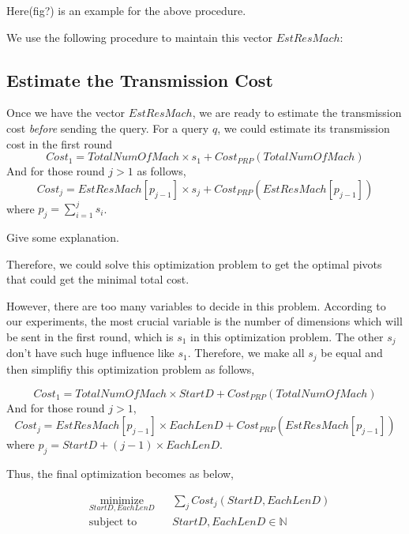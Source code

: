 Here(fig?) is an example for the above procedure.



We use the following procedure to maintain this vector $EstResMach$:








\subsection{Estimate the Transmission Cost} %
\label{ss:estimate_the_transmission_cost}

Once we have the vector $EstResMach$, we are ready to estimate the transmission cost \emph{before} sending the query.  For a query $q$, we could estimate its transmission cost in the first round 
\[
Cost_1 = TotalNumOfMach\times s_1 + Cost_{PRP}(TotalNumOfMach)
\]
And for those round $j>1$ as follows,
\[
Cost_j = EstResMach[p_{j-1}]\times s_j + Cost_{PRP}(EstResMach[p_{j-1}])
\]
where $p_j=\sum^j_{i=1}{s_i}$.

Give some explanation.

Therefore, we could solve this optimization problem to get the optimal pivots that could get the minimal total cost.

However, there are too many variables to decide in this problem.  According to our experiments, the most crucial variable is the number of dimensions which will be sent in the first round, which is $s_1$ in this optimization problem.  The other $s_j$ don't have such huge influence like $s_1$.  Therefore, we make all $s_j$ be equal and then simplifiy this optimization problem as follows,

\[
Cost_1 = TotalNumOfMach\times StartD + Cost_{PRP}(TotalNumOfMach)
\]
And for those round $j>1$,
\[
Cost_j = EstResMach[p_{j-1}]\times EachLenD + Cost_{PRP}(EstResMach[p_{j-1}])
\]
where $p_j=StartD + (j-1)\times EachLenD$.

Thus, the final optimization becomes as below,

\begin{equation}
\begin{aligned}
& \underset{StartD, EachLenD}{\text{minimize}}
& & \sum_j{Cost_j(StartD,EachLenD)} \\
& \text{subject to}
& & StartD, EachLenD \in \mathbb{N}
\end{aligned}
\end{equation}

